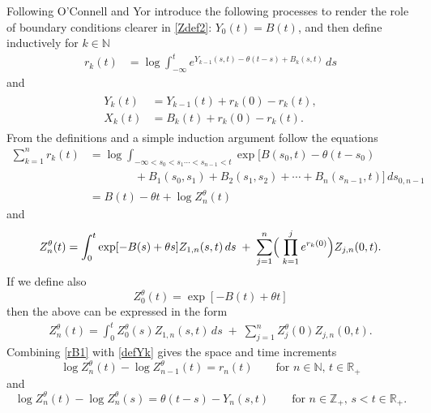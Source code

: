 \documentclass[11pt]{amsart}
\numberwithin{equation}{section}
\theoremstyle{remark}
\begin{document}
Following O'Connell and Yor \cite{oconn-yor-01} 
introduce the following processes to render the role of boundary conditions 
clearer in \eqref{Zdef2}: 
   ${Y}_0(t)=B(t)$, and then define inductively for 
$k\in{\mathbb{N}}$ 
\begin{equation}\begin{aligned}
  r_k(t)&=\log\int_{-\infty}^t e^{{Y}_{k-1}(s,t)-{\theta}(t-s)+B_k(s,t)}\,ds
\end{aligned}\label{defrk}\end{equation}
and 
\begin{eqnarray}\begin{aligned}  
{Y}_k(t)&= {Y}_{k-1}(t)+r_k(0)-r_k(t),\\
X_k(t)&=B_{k}(t)+r_k(0)-r_k(t).
\end{aligned}\label{defYk}\end{eqnarray}
From the definitions {and a simple induction argument} follow the equations  
\begin{equation}\begin{aligned} 
\sum_{k=1}^n r_k(t)
&= \log \int_{-\infty<s_{0}<s_1\dotsm<s_{n-1}<t}  \exp\bigl[ B(s_0,t)-{\theta}(t- s_0) \\[7pt]
 &\qquad \qquad +  B_1(s_0,s_1) 
+B_{2}(s_1,s_{2}) +\dotsm + B_n(s_{n-1},t)\bigr] \,ds_{0,n-1}\\[4pt]
&= B(t)-{\theta} t +\log Z_{n}^{\theta}(t) 
\end{aligned} \label{rB1}\end{equation}
and 
\begin{equation}\begin{aligned} 
Z_{n}^{\theta}(t) =  \int_0^t   \exp[- B(s)+{\theta} s] Z_{1,n}(s,t) \,ds
\;+ \; \sum_{j=1}^n  \Bigl( \;\prod_{k=1}^j e^{r_k(0)} \Bigr) Z_{j,n}(0,t). 
\end{aligned}\label{ZB2}\end{equation}
If we define  also 
\begin{equation}  Z_{0}^{\theta}(t)= \exp[ -B(t)+{\theta} t]  \label{Z0}\end{equation}
then the above can  be expressed in the form
\begin{equation}\begin{aligned} 
Z_{n}^{\theta}(t) =  \int_0^t  Z_{0}^{\theta}(s) Z_{1,n}(s,t) \, ds
\; + \; \sum_{j=1}^n  Z_{j}^{\theta}(0) Z_{j,n}(0,t). 
\end{aligned}\label{ZB3}\end{equation}
Combining \eqref{rB1} with \eqref{defYk}  gives the space and time increments 
\begin{equation} 
\log Z_{n}^{\theta}(t)- \log Z_{n-1}^{\theta}(t) = r_n(t)  \qquad
 \text{for $n\in{\mathbb{N}},\, t\in{\mathbb{R}}_+$}  \label{Zincr1}\end{equation}
and
\begin{equation} 
\log Z_{n}^{\theta}(t)- \log Z_{n}^{\theta}(s) = {\theta}(t-s)-{Y}_n(s,t)  \qquad
 \text{for $n\in{\mathbb{Z}}_+,\, s<t\in{\mathbb{R}}_+$} .  \label{Zincr2}\end{equation}
\end{document}
